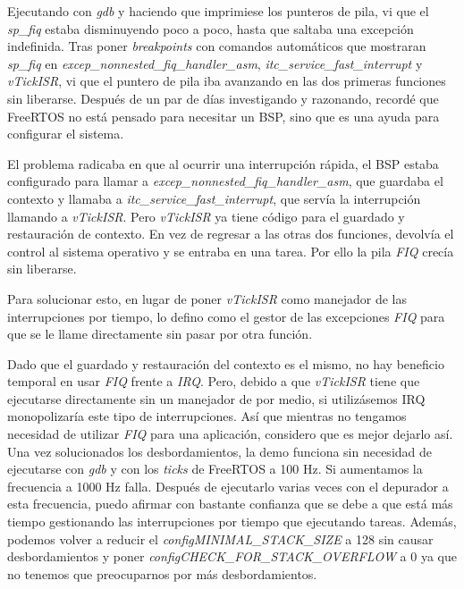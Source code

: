 Ejecutando con \emph{gdb} y haciendo que imprimiese los punteros de pila, vi que el \emph{sp\_fiq} estaba disminuyendo poco a poco, hasta que saltaba una excepción indefinida. Tras poner \emph{breakpoints} con comandos automáticos que mostraran \emph{sp\_fiq}
en \emph{excep\_nonnested\_fiq\_handler\_asm}, \emph{itc\_service\_fast\_interrupt} y \emph{vTickISR}, vi que el puntero de pila iba avanzando en las dos primeras funciones sin liberarse. Después de un par de días investigando y razonando, recordé que FreeRTOS no está pensado para necesitar un BSP, sino que es una ayuda para configurar el sistema.

El problema radicaba en que al ocurrir una interrupción rápida, el BSP estaba configurado para llamar a \emph{excep\_nonnested\_fiq\_handler\_asm}, que guardaba el contexto y llamaba a \emph{itc\_service\_fast\_interrupt}, que servía la interrupción llamando a \emph{vTickISR}. Pero \emph{vTickISR} ya tiene código para el guardado y restauración de contexto. En vez de regresar a las otras dos funciones, devolvía el control al sistema operativo y se entraba en una tarea. Por ello la pila \emph{FIQ} crecía sin liberarse.

Para solucionar esto, en lugar de poner \emph{vTickISR} como manejador de las interrupciones por tiempo, lo defino como el gestor de las excepciones \emph{FIQ} para que se le llame directamente sin pasar por otra función.

Dado que el guardado y restauración del contexto es el mismo, no hay beneficio temporal en usar \emph{FIQ} frente a \emph{IRQ}. Pero, debido a que \emph{vTickISR} tiene que ejecutarse directamente sin un manejador de por medio, si utilizásemos IRQ monopolizaría este tipo de interrupciones. Así que mientras no tengamos necesidad de utilizar \emph{FIQ} para una aplicación, considero que es mejor dejarlo así.\\

Una vez solucionados los desbordamientos, la demo funciona sin necesidad de ejecutarse con \emph{gdb} y con los \emph{ticks} de FreeRTOS a 100 Hz. Si aumentamos la frecuencia a 1000 Hz falla. Después de ejecutarlo varias veces con el depurador a esta frecuencia, puedo afirmar con bastante confianza que se debe a que está más tiempo gestionando las interrupciones por tiempo que ejecutando tareas. Además, podemos volver a reducir el \emph{configMINIMAL\_STACK\_SIZE} a 128 sin causar desbordamientos y poner \emph{configCHECK\_FOR\_STACK\_OVERFLOW} a 0 ya que no tenemos que preocuparnos por más desbordamientos.

